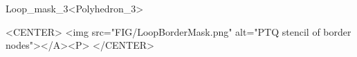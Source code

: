 \begin{ccRefClass}{Loop_mask_3<Polyhedron_3>}
\begin{ccHtmlOnly}
    <CENTER>
      <img src="FIG/LoopBorderMask.png" alt="PTQ stencil of border nodes"></A><P>
    </CENTER>
\end{ccHtmlOnly}

\ccSeeAlso

\\

\end{ccRefClass}

\ccRefPageEnd


